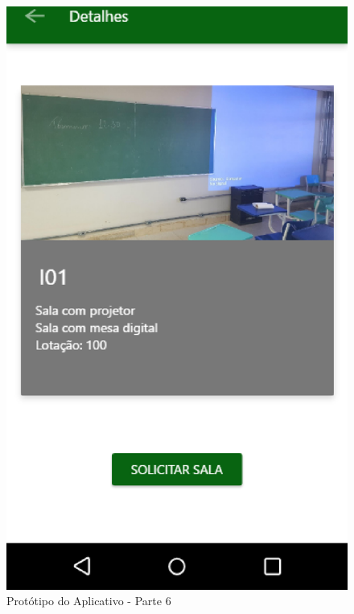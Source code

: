 \begin{anexosenv}
\begin{figure}[!h]
  \centering
  \includegraphics[keepaspectratio=true,scale=0.6]{figuras/prot-5.eps}
  \caption{Protótipo do Aplicativo - Parte 6}
\end{figure}

%

\end{anexosenv}
